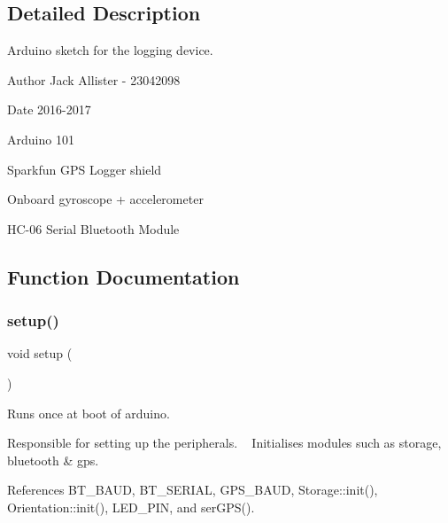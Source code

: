 \subsection{Detailed Description}
Arduino sketch for the logging device. 

\begin{DoxyAuthor}{Author}
Jack Allister -\/ 23042098 
\end{DoxyAuthor}
\begin{DoxyDate}{Date}
2016-\/2017
\begin{DoxyItemize}
\item Arduino 101
\item Sparkfun G\+PS Logger shield
\item Onboard gyroscope + accelerometer
\item H\+C-\/06 Serial Bluetooth Module 
\end{DoxyItemize}
\end{DoxyDate}


\subsection{Function Documentation}
\mbox{\label{logging-device_8ino_a4fc01d736fe50cf5b977f755b675f11d}} 
\subsubsection{\texorpdfstring{setup()}{setup()}}
{\footnotesize\ttfamily void setup (\begin{DoxyParamCaption}{ }\end{DoxyParamCaption})}



Runs once at boot of arduino. 

Responsible for setting up the peripherals. ~\newline
Initialises modules such as storage, bluetooth \& gps. 

References B\+T\+\_\+\+B\+A\+UD, B\+T\+\_\+\+S\+E\+R\+I\+AL, G\+P\+S\+\_\+\+B\+A\+UD, Storage\+::init(), Orientation\+::init(), L\+E\+D\+\_\+\+P\+IN, and ser\+G\+P\+S().


